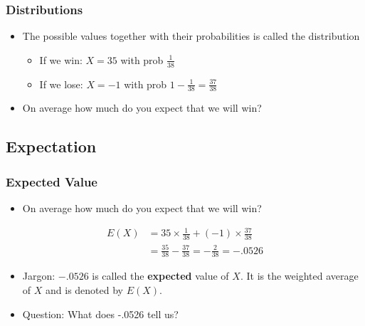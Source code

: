 \documentclass[
  ignorenonframetext,
]{beamer}
\providecommand{\tightlist}{%
  \setlength{\itemsep}{0pt}\setlength{\parskip}{0pt}}
\begin{document}
\begin{frame}
\frametitle{Distributions}

\begin{itemize}
\item
  The possible values together with their probabilities is called the
  distribution

  \begin{itemize}
  \tightlist
  \item
    If we win: \(X = 35\) with prob \(\frac{1}{38}\)
  \item
    If we lose: \(X = -1\) with prob
    \(1 - \frac{1}{38} = \frac{37}{38}\)
  \end{itemize}
\item
  On average how much do you expect that we will win?
\end{itemize}
\end{frame}

\hypertarget{expectation}{%
\subsection{Expectation}\label{expectation}}

\begin{frame}
\frametitle{Expected Value}

\begin{itemize}
\tightlist
\item
  On average how much do you expect that we will win?
\end{itemize}

\[\begin{split}
E(X)& = 35\times \frac{1}{38} +(-1)\times\frac{37}{38} \\
& =\frac{35}{38}-\frac{37}{38} =- \frac{2}{38} =-.0526  
\end{split}\]

\begin{itemize}
\item
  Jargon: \(-.0526\) is called the \textbf{expected} value of \(X\). It
  is the weighted average of \(X\) and is denoted by \(E(X)\).
\item
  Question: What does -.0526 tell us?
\end{itemize}
\end{frame}
\end{document}
